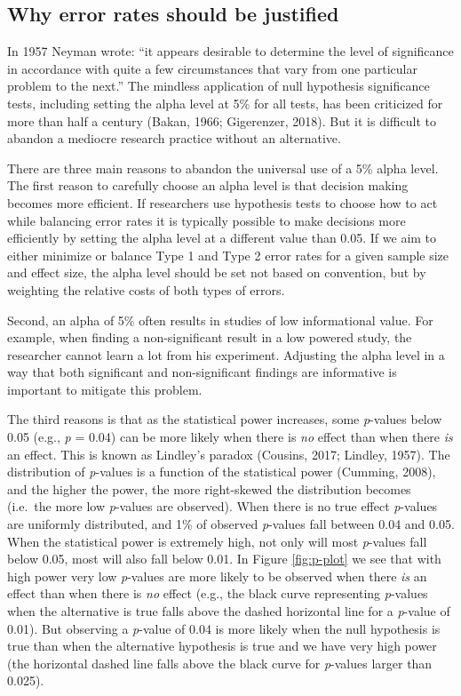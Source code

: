 \documentclass[
  english,
  ,jou,floatsintext]{apa6}
\begin{document}
\hypertarget{why-error-rates-should-be-justified}{%
\subsection{Why error rates should be justified}\label{why-error-rates-should-be-justified}}

In 1957 Neyman wrote: ``it appears desirable to determine the level of significance in accordance with quite a few circumstances that vary from one particular problem to the next.'' The mindless application of null hypothesis significance tests, including setting the alpha level at 5\% for all tests, has been criticized for more than half a century (Bakan, 1966; Gigerenzer, 2018). But it is difficult to abandon a mediocre research practice without an alternative.

There are three main reasons to abandon the universal use of a 5\% alpha level. The first reason to carefully choose an alpha level is that decision making becomes more efficient. If researchers use hypothesis tests to choose how to act while balancing error rates it is typically possible to make decisions more efficiently by setting the alpha level at a different value than 0.05. If we aim to either minimize or balance Type 1 and Type 2 error rates for a given sample size and effect size, the alpha level should be set not based on convention, but by weighting the relative costs of both types of errors.

Second, an alpha of 5\% often results in studies of low informational value. For example, when finding a non-significant result in a low powered study, the researcher cannot learn a lot from his experiment. Adjusting the alpha level in a way that both significant and non-significant findings are informative is important to mitigate this problem.

The third reasons is that as the statistical power increases, some \emph{p}-values below 0.05 (e.g., \emph{p} = 0.04) can be more likely when there is \emph{no} effect than when there \emph{is} an effect. This is known as Lindley's paradox (Cousins, 2017; Lindley, 1957). The distribution of \emph{p}-values is a function of the statistical power (Cumming, 2008), and the higher the power, the more right-skewed the distribution becomes (i.e.~the more low \emph{p}-values are observed). When there is no true effect \emph{p}-values are uniformly distributed, and 1\% of observed \emph{p}-values fall between 0.04 and 0.05. When the statistical power is extremely high, not only will most \emph{p}-values fall below 0.05, most will also fall below 0.01. In Figure \ref{fig:p-plot} we see that with high power very low \emph{p}-values are more likely to be observed when there \emph{is} an effect than when there is \emph{no} effect (e.g., the black curve representing \emph{p}-values when the alternative is true falls above the dashed horizontal line for a \emph{p}-value of 0.01). But observing a \emph{p}-value of 0.04 is more likely when the null hypothesis is true than when the alternative hypothesis is true and we have very high power (the horizontal dashed line falls above the black curve for \emph{p}-values larger than 0.025).
\end{document}
